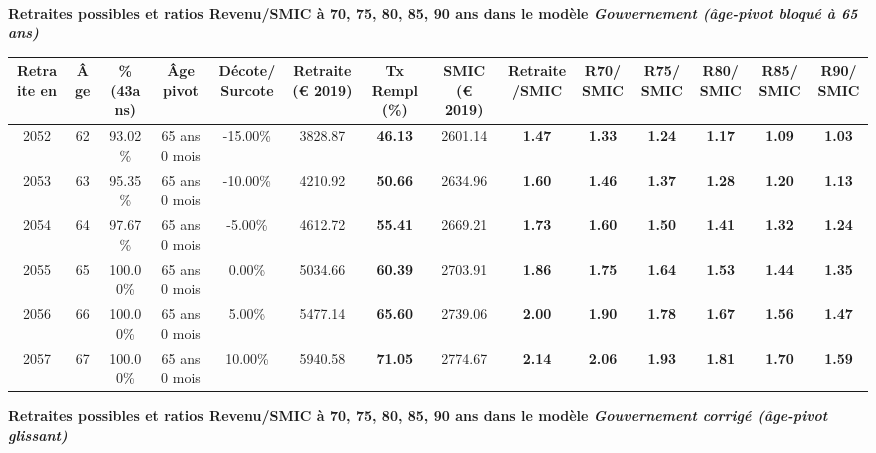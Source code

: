  ~\\{\bf \noindent Retraites possibles et ratios Revenu/SMIC à 70, 75, 80, 85, 90 ans dans le modèle \emph{Gouvernement (âge-pivot bloqué à 65 ans)}}  
 
\begin{adjustbox}{max width=\textwidth} 
\begin{tabular}[htb]{|c|c||c|c|c||c|c||c|c||c|c|c|c|c|} 
\hline 
 Retraite en &  Âge &  \%(43ans) &  Âge pivot &  Décote/Surcote &  Retraite (\euro{} 2019) &  Tx Rempl(\%) &  SMIC (\euro{} 2019) &  Retraite/SMIC &  R70/SMIC &  R75/SMIC &  R80/SMIC &  R85/SMIC &  R90/SMIC \\ 
\hline \hline 
 2052 &  62 &  93.02\% &  65 ans 0 mois &  -15.00\% &  3828.87 &  {\bf 46.13} &  2601.14 &  {\bf 1.47} &  {\bf 1.33} &  {\bf 1.24} &  {\bf 1.17} &  {\bf 1.09} &  {\bf 1.03} \\ 
\hline 
 2053 &  63 &  95.35\% &  65 ans 0 mois &  -10.00\% &  4210.92 &  {\bf 50.66} &  2634.96 &  {\bf 1.60} &  {\bf 1.46} &  {\bf 1.37} &  {\bf 1.28} &  {\bf 1.20} &  {\bf 1.13} \\ 
\hline 
 2054 &  64 &  97.67\% &  65 ans 0 mois &  -5.00\% &  4612.72 &  {\bf 55.41} &  2669.21 &  {\bf 1.73} &  {\bf 1.60} &  {\bf 1.50} &  {\bf 1.41} &  {\bf 1.32} &  {\bf 1.24} \\ 
\hline 
 2055 &  65 &  100.00\% &  65 ans 0 mois &  0.00\% &  5034.66 &  {\bf 60.39} &  2703.91 &  {\bf 1.86} &  {\bf 1.75} &  {\bf 1.64} &  {\bf 1.53} &  {\bf 1.44} &  {\bf 1.35} \\ 
\hline 
 2056 &  66 &  100.00\% &  65 ans 0 mois &  5.00\% &  5477.14 &  {\bf 65.60} &  2739.06 &  {\bf 2.00} &  {\bf 1.90} &  {\bf 1.78} &  {\bf 1.67} &  {\bf 1.56} &  {\bf 1.47} \\ 
\hline 
 2057 &  67 &  100.00\% &  65 ans 0 mois &  10.00\% &  5940.58 &  {\bf 71.05} &  2774.67 &  {\bf 2.14} &  {\bf 2.06} &  {\bf 1.93} &  {\bf 1.81} &  {\bf 1.70} &  {\bf 1.59} \\ 
\hline 
\hline 
\end{tabular} 
\end{adjustbox} 
 
 \vspace{0.1cm} 
{\bf \noindent Retraites possibles et ratios Revenu/SMIC à 70, 75, 80, 85, 90 ans dans le modèle \emph{Gouvernement corrigé (âge-pivot glissant)}}  
 
